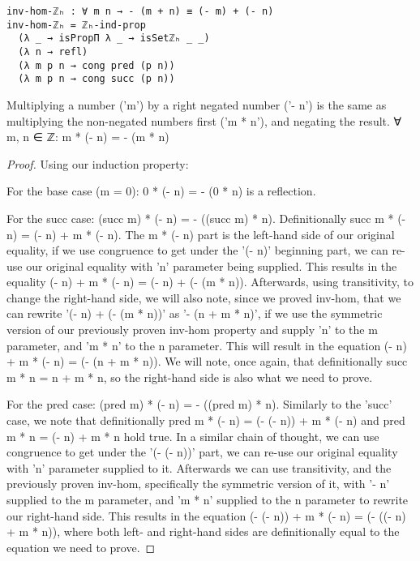 \begin{verbatim}
inv-hom-ℤₕ : ∀ m n → - (m + n) ≡ (- m) + (- n)
inv-hom-ℤₕ = ℤₕ-ind-prop
  (λ _ → isPropΠ λ _ → isSetℤₕ _ _)
  (λ n → refl)
  (λ m p n → cong pred (p n))
  (λ m p n → cong succ (p n))
\end{verbatim}

\begin{theorem}
  Multiplying a number ('m') by a right negated number ('- n') is the same as multiplying the non-negated numbers first ('m * n'), and negating the result. ∀ m, n ∈ ℤ: m * (- n) = - (m * n)
\end{theorem}

\begin{proof}
  Using our induction property:

  For the base case (m = 0): 0 * (- n) = - (0 * n) is a reflection.

  For the succ case: (succ m) * (- n) = - ((succ m) * n). Definitionally succ m * (- n) = (- n) + m * (- n). The m * (- n) part is the left-hand side of our original equality, if we use congruence to get under the '(- n)' beginning part, we can re-use our original equality with 'n' parameter being supplied. This results in the equality (- n) + m * (- n) = (- n) + (- (m * n)). Afterwards, using transitivity, to change the right-hand side, we will also note, since we proved inv-hom, that we can rewrite '(- n) + (- (m * n))' as '- (n + m * n)', if we use the symmetric version of our previously proven inv-hom property and supply 'n' to the m parameter, and 'm * n' to the n parameter. This will result in the equation (- n) + m * (- n) = (- (n + m * n)). We will note, once again, that definitionally succ m * n = n + m * n, so the right-hand side is also what we need to prove.

  For the pred case: (pred m) * (- n) = - ((pred m) * n). Similarly to the 'succ' case, we note that definitionally pred m * (- n) = (- (- n)) + m * (- n) and pred m * n = (- n) + m * n hold true. In a similar chain of thought, we can use congruence to get under the '(- (- n))' part, we can re-use our original equality with 'n' parameter supplied to it. Afterwards we can use transitivity, and the previously proven inv-hom, specifically the symmetric version of it, with '- n' supplied to the m parameter, and 'm * n' supplied to the n parameter to rewrite our right-hand side. This results in the equation (- (- n)) + m * (- n) = (- ((- n) + m * n)), where both left- and right-hand sides are definitionally equal to the equation we need to prove.
\end{proof}

